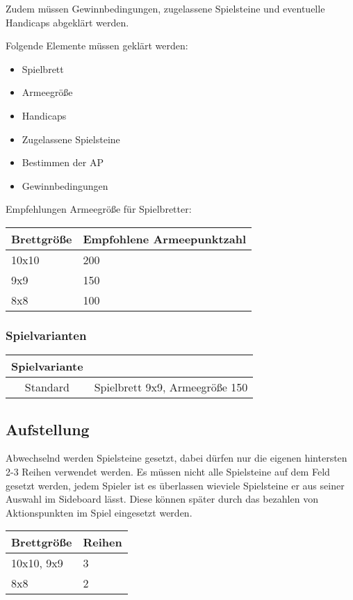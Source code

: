 \documentclass{article}
\begin{document}
	Zudem müssen Gewinnbedingungen, zugelassene Spielsteine und eventuelle Handicaps abgeklärt werden. 

	Folgende Elemente müssen geklärt werden:
	\begin{itemize}
	\item Spielbrett 
	\item Armeegröße 
	\item Handicaps 
	\item Zugelassene Spielsteine 
	\item Bestimmen der AP
	\item Gewinnbedingungen
	\end{itemize}
	
	Empfehlungen Armeegröße für Spielbretter:
	
	\begin{tabular}{ll}
	\hline
	Brettgröße & Empfohlene Armeepunktzahl \\ \hline
	10x10 & 200 \\
	9x9 & 150 \\
	8x8 & 100 \\ 
	\end{tabular} 
	
	\subsubsection{Spielvarianten}
	\begin{tabular}{cc}
    \hline 
    Spielvariante &  \\ 
    \hline 
    Standard & Spielbrett 9x9, Armeegröße 150
    \\ 
	\hline 
	\end{tabular} 
	

\subsection{Aufstellung}

	Abwechselnd werden Spielsteine gesetzt, dabei dürfen nur die eigenen
	hintersten 2-3 Reihen verwendet werden. Es müssen nicht alle Spielsteine
	auf dem Feld gesetzt werden, jedem Spieler ist es überlassen wieviele Spielsteine
	er aus seiner Auswahl im Sideboard lässt. Diese können später durch das bezahlen
	von Aktionspunkten im Spiel eingesetzt werden.
	
	\begin{tabular}{ll}
	\hline
	Brettgröße & Reihen \\ \hline
	10x10, 9x9 & 3 \\
	8x8        & 2 \\ 
	\end{tabular} 
	
\end{document}
